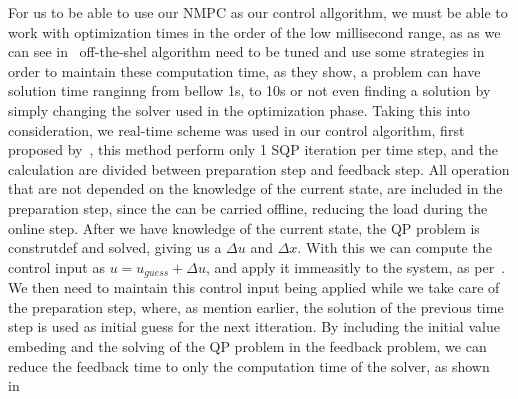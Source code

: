 For us to be able to use our NMPC as our control allgorithm, we must be able to work with optimization times in the order of the low millisecond range, as as we can see in~\cite{7400956} off-the-shel algorithm need to be tuned and use some strategies in order to maintain these computation time, as they show, a problem can have solution time ranginng from bellow 1s, to 10s or not even finding a solution by simply changing the solver used in the optimization phase. Taking this into consideration, we real-time scheme was used in our control algorithm, first proposed by~\cite{diehl2002real}, this method perform only 1 SQP iteration per time step, and the calculation are divided between preparation step and feedback step. All operation that are not depended on the knowledge of the current state, are included in the preparation step, since the can be carried offline, reducing the load during the online step. After we have knowledge of the current state, the QP problem is construtdef and solved, giving us a $\Delta u$ and $\Delta x$. With this we can compute the control input as $u = u_{guess} + \Delta u$, and apply it immeasitly to the system, as per~\cite{diehl2005real}. We then need to maintain this control input being applied while we take care of the preparation step, where, as mention earlier, the solution of the previous time step is used as initial guess for the next itteration. By including the initial value embeding and the solving of the QP problem in the feedback problem, we can reduce the feedback time to only the computation time of the solver, as shown in~\cite{gros2020linear}

